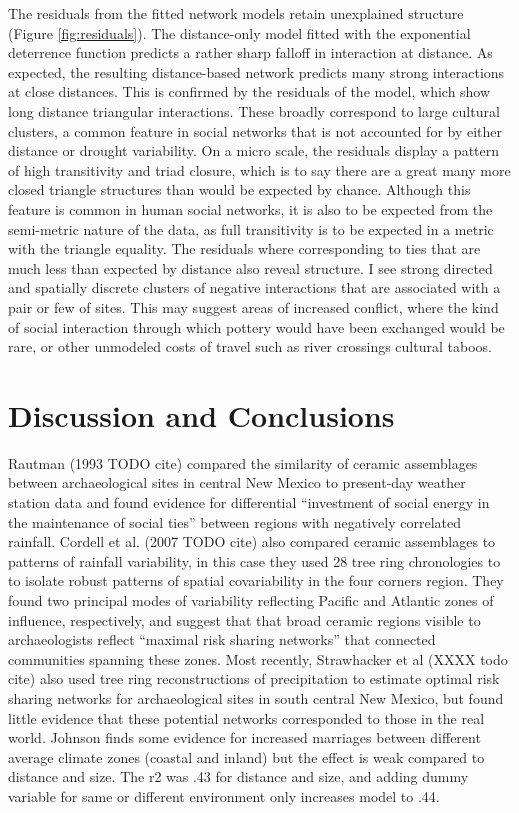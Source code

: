 \documentclass[11pt]{wlscirep}
\begin{document}
The residuals from the fitted network models retain unexplained structure (Figure \ref{fig:residuals}). The distance-only model fitted with the exponential deterrence function predicts a rather sharp falloff in interaction at distance. As expected, the resulting distance-based network predicts many strong interactions at close distances. This is confirmed by the residuals of the model, which show long distance triangular interactions. These broadly correspond to large cultural clusters, a common feature in social networks that is not accounted for by either distance or drought variability. On a micro scale, the residuals display a pattern of high transitivity and triad closure, which is to say there are a great many more closed triangle structures than would be expected by chance. Although this feature is common in human social networks, it is also to be expected from the semi-metric nature of the data, as full transitivity is to be expected in a metric with the triangle equality. The residuals where corresponding to ties that are much less than expected by distance also reveal structure. I see strong directed and spatially discrete clusters of negative interactions that are associated with a pair or few of sites. This may suggest areas of increased conflict, where the kind of social interaction through which pottery would have been exchanged would be rare, or other unmodeled costs of travel such as river crossings cultural taboos. 



\section*{Discussion and Conclusions}
Rautman (1993 TODO cite) compared the similarity of ceramic assemblages between archaeological sites in central New Mexico to present-day weather station data and found evidence for differential ``investment of social energy in the maintenance of social ties'' between regions with negatively correlated rainfall. Cordell et al. (2007 TODO cite) also compared ceramic assemblages to patterns of rainfall variability, in this case they used 28 tree ring chronologies to to isolate robust patterns of spatial covariability in the four corners region. They found two principal modes of variability reflecting Pacific and Atlantic zones of influence, respectively, and suggest that that broad ceramic regions visible to archaeologists reflect ``maximal risk sharing networks'' that connected communities spanning these zones. Most recently, Strawhacker et al (XXXX todo cite) also used tree ring reconstructions of precipitation to estimate optimal risk sharing networks for archaeological sites in south central New Mexico, but found little evidence that these potential networks corresponded to those in the real world. Johnson finds some evidence for increased marriages between different average climate zones (coastal and inland) but the effect is weak compared to distance and  size. The r2 was .43 for distance and size, and adding dummy variable for same or different environment only increases model to .44.
\end{document}
